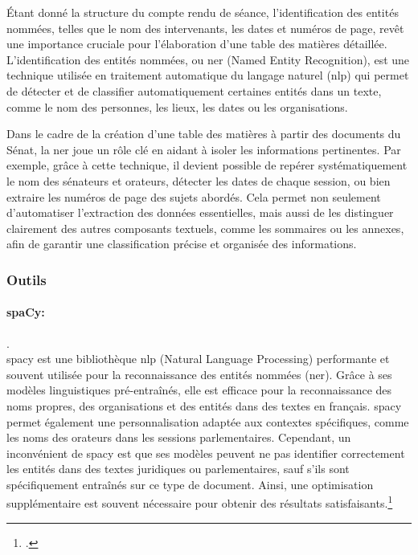 Étant donné la structure du compte rendu de séance, l'identification des entités nommées, telles que le nom des intervenants, les dates et numéros de page, revêt une importance cruciale pour l'élaboration d'une table des matières détaillée. L'identification des entités nommées, ou \gls{ner} (Named Entity Recognition), est une technique utilisée en traitement automatique du langage naturel (\gls{nlp}) qui permet de détecter et de classifier automatiquement certaines entités dans un texte, comme le nom des personnes, les lieux, les dates ou les organisations.

Dans le cadre de la création d'une table des matières à partir des documents du Sénat, la \gls{ner} joue un rôle clé en aidant à isoler les informations pertinentes. Par exemple, grâce à cette technique, il devient possible de repérer systématiquement le nom des sénateurs et orateurs, détecter les dates de chaque session, ou bien extraire les numéros de page des sujets abordés. Cela permet non seulement d'automatiser l'extraction des données essentielles, mais aussi de les distinguer clairement des autres composants textuels, comme les sommaires ou les annexes, afin de garantir une classification précise et organisée des informations.

\subsubsection{Outils}

\paragraph{spaCy:}.\\
\gls{spacy} est une bibliothèque \gls{nlp} (Natural Language Processing) performante et souvent utilisée pour la reconnaissance des entités nommées (\gls{ner}). Grâce à ses modèles linguistiques pré-entraînés, elle est efficace pour la reconnaissance des noms propres, des organisations et des entités dans des textes en français. \gls{spacy} permet également une personnalisation adaptée aux contextes spécifiques, comme les noms des orateurs dans les sessions parlementaires. Cependant, un inconvénient de \gls{spacy} est que ses modèles peuvent ne pas identifier correctement les entités dans des textes juridiques ou parlementaires, sauf s'ils sont spécifiquement entraînés sur ce type de document. Ainsi, une optimisation supplémentaire est souvent nécessaire pour obtenir des résultats satisfaisants.\footcite{spacy_docs}

